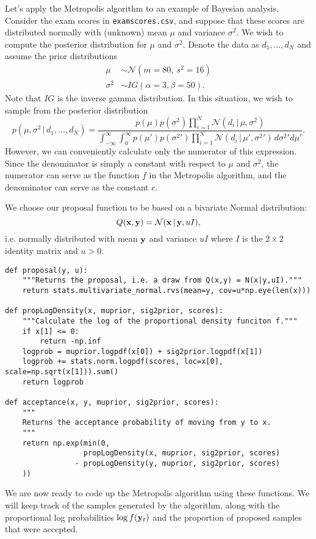 Let's apply the Metropolis algorithm to an example of Bayesian analysis.
Consider the exam scores in \texttt{examscores.csv}, and suppose that these scores are distributed normally with (unknown) mean $\mu$ and variance $\sigma^2$.
We wish to compute the posterior distribution for $\mu$ and $\sigma^2$.
Denote the data as $d_1,\ldots,d_N$ and assume the prior distributions
\begin{align*}
\mu &\sim \mathcal{N}(m=80,\ s^2=16)\\
\sigma^2 &\sim IG(\alpha=3,\beta=50).
\end{align*}
Note that $IG$ is the inverse gamma distribution.
In this situation, we wish to sample from the posterior distribution
\[
p(\mu,\sigma^2 \,|\,d_1,\ldots,d_N)
= \frac{
p(\mu)p(\sigma^2)\prod_{i=1}^N \mathcal{N}(d_i \, | \, \mu, \sigma^2)
}
{
\int_{-\infty}^\infty
\int_{0}^\infty
p(\mu')p({\sigma^2}')
\prod_{i=1}^N
\mathcal{N}(d_i \, | \, \mu', {\sigma^2}')
\,d{\sigma^2}' d\mu'
}.
\]
However, we can conveniently calculate only the numerator of this expression.
Since the denominator is simply a constant with respect to $\mu$ and $\sigma^2$, the numerator can serve as the function $f$ in the Metropolis algorithm, and the denominator can serve as the constant $c$.

We choose our proposal function to be based on a bivariate Normal distribution:
\[
Q(\mathbf{x},\mathbf{y}) = \mathcal{N}(\mathbf{x}\, | \, \mathbf{y}, uI),
\]
i.e. normally distributed with mean $\mathbf{y}$ and variance $uI$
where $I$ is the $2\times 2$ identity matrix and $u>0$.
\begin{lstlisting}
def proposal(y, u):
    """Returns the proposal, i.e. a draw from Q(x,y) = N(x|y,uI)."""
    return stats.multivariate_normal.rvs(mean=y, cov=u*np.eye(len(x)))

def propLogDensity(x, muprior, sig2prior, scores):
    """Calculate the log of the proportional density funciton f."""
    if x[1] <= 0:
        return -np.inf
    logprob = muprior.logpdf(x[0]) + sig2prior.logpdf(x[1])
    logprob += stats.norm.logpdf(scores, loc=x[0], scale=np.sqrt(x[1])).sum()
    return logprob

def acceptance(x, y, muprior, sig2prior, scores):
    """
    Returns the acceptance probability of moving from y to x.
    """
    return np.exp(min(0,
                  propLogDensity(x, muprior, sig2prior, scores)
                - propLogDensity(y, muprior, sig2prior, scores)
    ))
\end{lstlisting}

We are now ready to code up the Metropolis algorithm using these functions.
We will keep track of the samples generated by the algorithm, along with the proportional log probabilities $\log f(\mathbf{y}_t)$ and the proportion of proposed samples that were accepted.


